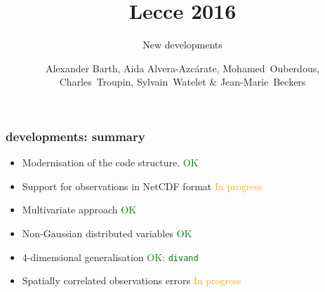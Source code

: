 
\parindent 0cm

\author[Alexander Barth, Aida Alvera-Azc\'{a}rate, Mohamed~Ouberdous, Charles~Troupin, Sylvain~Watelet \& Jean-Marie~Beckers]{Alexander Barth, Aida Alvera-Azc\'{a}rate, Mohamed~Ouberdous,\\
 Charles~Troupin, Sylvain~Watelet \& Jean-Marie~Beckers}
  
\title[]{\diva Lecce 2016}
\subtitle{New developments}
\date{}


\maketitlepage %


\newcommand{\ignore}[1]{}

\newenvironment{changemargin}[2]{\begin{list}{}{%
\setlength{\topsep}{0pt}%
\setlength{\leftmargin}{0pt}%
\setlength{\rightmargin}{0pt}%
\setlength{\listparindent}{\parindent}%
\setlength{\itemindent}{\parindent}%
\setlength{\parsep}{0pt plus 1pt}%
\addtolength{\leftmargin}{#1}%
\addtolength{\rightmargin}{#2}%
}\item }{\end{list}}


\begin{frame}[c]
\frametitle{\diva developments: summary}

\begin{itemize}

\item<1-> Modernisation of the code structure. \hfill  \textcolor{Green}{OK}
 
\item<2-> Support for observations in NetCDF format \hfill \textcolor{Orange}{In progress}

\item<3-> Multivariate approach   \hfill  \textcolor{Green}{OK}

\item<4-> Non-Gaussian distributed variables \hfill  \textcolor{Green}{OK}

\item<5-> 4-dimensional generalisation \hfill  \textcolor{Green}{OK: \texttt{divand}}

\item<6-> Spatially correlated observations errors \hfill \textcolor{Orange}{In progress}

\end{itemize}

\end{frame}


